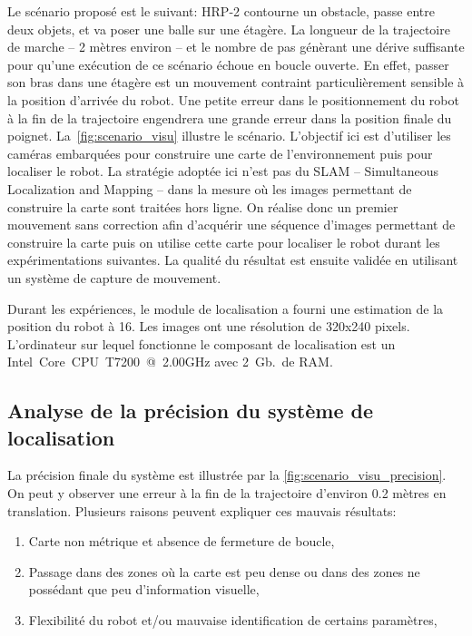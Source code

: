 Le scénario proposé est le suivant: HRP-2 contourne un
obstacle, passe entre deux objets, et va poser une balle sur une
étagère. La longueur de la trajectoire de marche -- 2 mètres environ
-- et le nombre de pas génèrant une dérive suffisante pour qu'une
exécution de ce scénario échoue en boucle ouverte. En effet, passer
son bras dans une étagère est un mouvement contraint particulièrement
sensible à la position d'arrivée du robot. Une petite erreur dans le
positionnement du robot à la fin de la trajectoire engendrera une
grande erreur dans la position finale du
poignet. La \autoref{fig:scenario_visu} illustre le scénario.
L'objectif ici est d'utiliser les caméras embarquées pour construire
une carte de l'environnement puis pour localiser le robot. La
stratégie adoptée ici n'est pas du SLAM -- Simultaneous Localization
and Mapping --
dans la mesure où les images permettant de construire la carte sont
traitées hors ligne. On réalise donc un premier mouvement sans
correction afin d'acquérir une séquence d'images permettant de
construire la carte puis on utilise cette carte pour localiser le
robot durant les expérimentations suivantes. La qualité du résultat
est ensuite validée en utilisant un système de capture de mouvement.


Durant les expériences, le module de localisation a fourni une
estimation de la position du robot à 16\hertz. Les images ont une
résolution de 320x240 pixels. L'ordinateur sur lequel fonctionne le
composant de localisation est un
\mbox{Intel\textregistered~Core CPU T7200 @ 2.00GHz}
avec 2 Gb.\ de RAM.


\subsection{Analyse de la précision du système de localisation}

La précision finale du système est illustrée par la
\autoref{fig:scenario_visu_precision}. On peut y observer une erreur à
la fin de la trajectoire d'environ 0.2 mètres en
translation. Plusieurs raisons peuvent expliquer ces mauvais
résultats:
\begin{enumerate}
\item Carte non métrique et absence de fermeture de boucle,
\item Passage dans des zones où la carte est peu dense ou dans des
  zones ne possédant que peu d'information visuelle,
\item Flexibilité du robot et/ou mauvaise identification de certains paramètres,
\end{enumerate}


